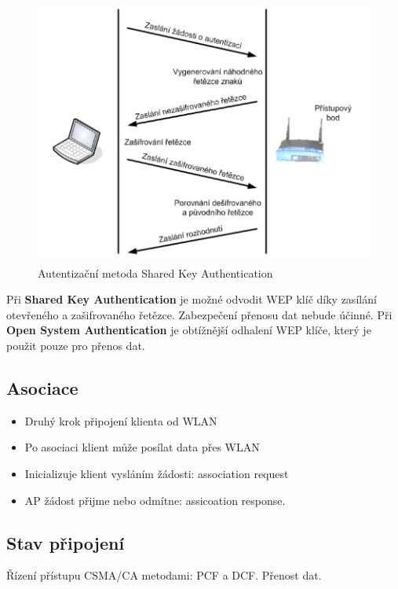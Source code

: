 \begin{figure}[ht]
\centering
  \begin{center}
    \includegraphics[scale=0.5]{images/SKA.png}
  \end{center}
  \caption[Autentizační metoda Shared Key Authentication]{Autentizační metoda Shared Key Authentication}
\end{figure}
Při \textbf{Shared Key Authentication} je možné odvodit WEP klíč díky zasílání otevřeného a zašifrovaného řetězce. Zabezpečení přenosu dat nebude účinné. Při \textbf{Open System Authentication} je obtížnější odhalení WEP klíče, který je použit pouze pro přenos dat.
\subsection{Asociace}
\begin{itemize}
    \item Druhý krok připojení klienta od WLAN
    \item Po asociaci klient může posílat data přes WLAN
    \item Inicializuje klient vysláním žádosti: association request
    \item AP žádost přijme nebo odmítne: assicoation response.
\end{itemize}
\subsection{Stav připojení}
Řízení přístupu CSMA/CA metodami: PCF a DCF. Přenost dat.
